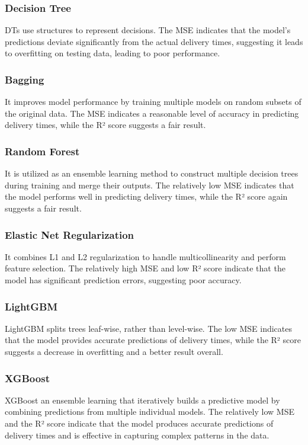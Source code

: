 \documentclass[10pt,twocolumn,letterpaper]{article}
\begin{document}
        \subsubsection{Decision Tree}
            DTs use structures to represent decisions. The MSE indicates that the model's predictions deviate significantly from the actual delivery times, suggesting it leads to overfitting on testing data, leading to poor performance.

        \subsubsection{Bagging}
            It improves model performance by training multiple models on random subsets of the original data. The MSE indicates a reasonable level of accuracy in predicting delivery times, while the R² score suggests a fair result.

        \subsubsection{Random Forest}
            It is utilized as an ensemble learning method to construct multiple decision trees during training and merge their outputs. The relatively low MSE indicates that the model performs well in predicting delivery times, while the R² score again suggests a fair result.

        \subsubsection{Elastic Net Regularization}
            It combines L1 and L2 regularization to handle multicollinearity and perform feature selection. The relatively high MSE and low R² score indicate that the model has significant prediction errors, suggesting poor accuracy.

        \subsubsection{LightGBM}
            LightGBM splits trees leaf-wise, rather than level-wise.
            The low MSE indicates that the model provides accurate predictions of delivery times, while the R² score suggests a decrease in overfitting and a better result overall.

        \subsubsection{XGBoost}
            XGBoost an ensemble learning that iteratively builds a predictive model by combining predictions from multiple individual models. The relatively low MSE and the R² score indicate that the model produces accurate predictions of delivery times and is effective in capturing complex patterns in the data.
\end{document}
